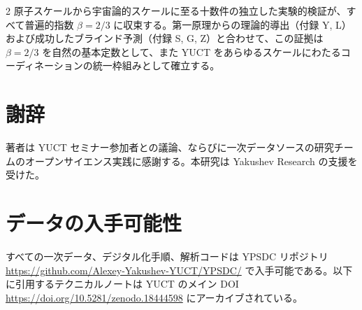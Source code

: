 \documentclass[11pt,a4paper]{article}
\newcommand{\betaf}{\beta}
\begin{document}
\begin{multicols}{2}
		原子スケールから宇宙論的スケールに至る十数件の独立した実験的検証が、すべて普遍的指数 \(\betaf = 2/3\) に収束する。第一原理からの理論的導出（付録 Y, L）および成功したブラインド予測（付録 S, G, Z）と合わせて、この証拠は \(\betaf = 2/3\) を自然の基本定数として、また YUCT をあらゆるスケールにわたるコーディネーションの統一枠組みとして確立する。
		
		\section*{謝辞}
		
		著者は YUCT セミナー参加者との議論、ならびに一次データソースの研究チームのオープンサイエンス実践に感謝する。本研究は Yakushev Research の支援を受けた。
		
		\section*{データの入手可能性}
		
		すべての一次データ、デジタル化手順、解析コードは YPSDC リポジトリ \url{https://github.com/Alexey-Yakushev-YUCT/YPSDC/} で入手可能である。以下に引用するテクニカルノートは YUCT のメイン DOI \url{https://doi.org/10.5281/zenodo.18444598} にアーカイブされている。
		

\end{multicols}
\end{document}
